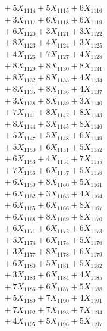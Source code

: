 \documentclass[a4paper,10pt]{article}
\begin{document}
{\begin{align}
&\;  + 5 X_{1114} + 5 X_{1115} + 6 X_{1116} \\[0.3ex]
&\;  + 3 X_{1117} + 6 X_{1118} + 6 X_{1119} \\[0.5ex]\allowbreak
&\;  + 6 X_{1120} + 3 X_{1121} + 3 X_{1122} \\[0.3ex]
&\;  + 8 X_{1123} + 4 X_{1124} + 3 X_{1125} \\[0.3ex]
&\;  + 4 X_{1126} + 7 X_{1127} + 4 X_{1128} \\[0.3ex]
&\;  + 8 X_{1129} + 8 X_{1130} + 8 X_{1131} \\[0.3ex]
&\;  + 8 X_{1132} + 8 X_{1133} + 4 X_{1134} \\[0.3ex]
&\;  + 8 X_{1135} + 8 X_{1136} + 4 X_{1137} \\[0.3ex]
&\;  + 3 X_{1138} + 8 X_{1139} + 3 X_{1140} \\[0.3ex]
&\;  + 7 X_{1141} + 8 X_{1142} + 8 X_{1143} \\[0.3ex]
&\;  + 8 X_{1144} + 3 X_{1145} + 8 X_{1146} \\[0.3ex]
&\;  + 5 X_{1147} + 5 X_{1148} + 6 X_{1149} \\[0.5ex]\allowbreak
&\;  + 5 X_{1150} + 6 X_{1151} + 5 X_{1152} \\[0.3ex]
&\;  + 6 X_{1153} + 4 X_{1154} + 7 X_{1155} \\[0.3ex]
&\;  + 7 X_{1156} + 6 X_{1157} + 5 X_{1158} \\[0.3ex]
&\;  + 6 X_{1159} + 8 X_{1160} + 5 X_{1161} \\[0.3ex]
&\;  + 6 X_{1162} + 3 X_{1163} + 4 X_{1164} \\[0.3ex]
&\;  + 6 X_{1165} + 6 X_{1166} + 8 X_{1167} \\[0.3ex]
&\;  + 6 X_{1168} + 8 X_{1169} + 8 X_{1170} \\[0.3ex]
&\;  + 6 X_{1171} + 6 X_{1172} + 6 X_{1173} \\[0.3ex]
&\;  + 5 X_{1174} + 6 X_{1175} + 5 X_{1176} \\[0.3ex]
&\;  + 3 X_{1177} + 8 X_{1178} + 6 X_{1179} \\[0.5ex]\allowbreak
&\;  + 6 X_{1180} + 5 X_{1181} + 5 X_{1182} \\[0.3ex]
&\;  + 3 X_{1183} + 6 X_{1184} + 4 X_{1185} \\[0.3ex]
&\;  + 7 X_{1186} + 6 X_{1187} + 5 X_{1188} \\[0.3ex]
&\;  + 5 X_{1189} + 7 X_{1190} + 4 X_{1191} \\[0.3ex]
&\;  + 7 X_{1192} + 7 X_{1193} + 7 X_{1194} \\[0.3ex]
&\;  + 4 X_{1195} + 5 X_{1196} + 5 X_{1197} \\[0.3ex]

\end{align}}
\end{document}
